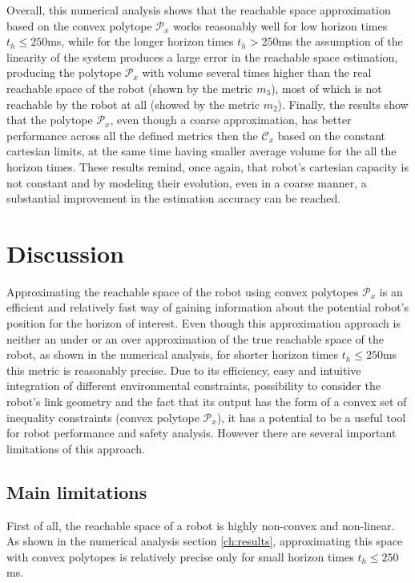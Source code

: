 Overall, this numerical analysis shows that the reachable space approximation based on the convex polytope $\mathcal{P}_x$ works reasonably well for low horizon times $t_h\leq250$ms, while for the longer horizon times $t_h>250$ms the assumption of the linearity of the system produces a large error in the reachable space estimation, producing the polytope $\mathcal{P}_x$ with volume several times higher than the real reachable space of the robot (shown by the metric $m_3$), most of which is not reachable by the robot at all (showed by the metric $m_2$). Finally, the results show that the polytope $\mathcal{P}_x$, even though a coarse approximation, has better performance across all the defined metrics then the $\mathcal{C}_x$ based on the constant cartesian limits, at the same time having smaller average volume for the all the horizon times. These results remind, once again, that robot's cartesian capacity is not constant and by modeling their evolution, even in a coarse manner, a substantial improvement in the estimation accuracy can be reached.
\vspace{-0.3cm}
\section{Discussion}
\label{ch:discussion}
\vspace{-0.2cm}
Approximating the reachable space of the robot using convex polytopes $\mathcal{P}_x$ is an efficient and relatively fast way of gaining information about the potential robot's position for the horizon of interest. Even though this approximation approach is neither an under or an over approximation of the true reachable space of the robot, as shown in the numerical analysis, for shorter horizon times $t_h\leq250$ms this metric is reasonably precise. Due to its efficiency, easy and intuitive integration of different environmental constraints, possibility to consider the robot's link geometry and the fact that its output has the form of a convex set of inequality constraints (convex polytope $\mathcal{P}_x$), it has a potential to be a useful tool for robot performance and safety analysis. However there are several important limitations of this approach.

\subsection{Main limitations}
First of all, the reachable space of a robot is highly non-convex and non-linear. As shown in the numerical analysis section \ref{ch:results}, approximating this space with convex polytopes is relatively precise only for small horizon times $t_h\leq250$ms.

